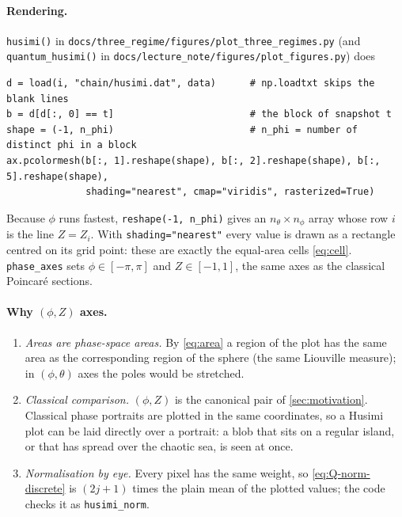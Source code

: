 \documentclass[11pt,a4paper]{article}
\begin{document}
\paragraph{Rendering.} \texttt{husimi()} in \texttt{docs/three\_regime/figures/plot\_three\_regimes.py} (and
\texttt{quantum\_husimi()} in \texttt{docs/lecture\_note/figures/plot\_figures.py}) does
\begin{lstlisting}[style=python]
d = load(i, "chain/husimi.dat", data)      # np.loadtxt skips the blank lines
b = d[d[:, 0] == t]                        # the block of snapshot t
shape = (-1, n_phi)                        # n_phi = number of distinct phi in a block
ax.pcolormesh(b[:, 1].reshape(shape), b[:, 2].reshape(shape), b[:, 5].reshape(shape),
              shading="nearest", cmap="viridis", rasterized=True)
\end{lstlisting}
Because $\phi$ runs fastest, \lstinline[style=python]!reshape(-1, n_phi)! gives an $n_\theta\times n_\phi$ array whose
row $i$ is the line $Z = Z_i$. With \lstinline[style=python]!shading="nearest"! every value is drawn as a rectangle
centred on its grid point: these are exactly the equal-area cells \eqref{eq:cell}. \texttt{phase\_axes} sets
$\phi\in[-\pi,\pi]$ and $Z\in[-1,1]$, the same axes as the classical Poincar\'e sections.

\paragraph{Why $(\phi,Z)$ axes.}
\begin{enumerate}
  \item \emph{Areas are phase-space areas.} By \eqref{eq:area} a region of the plot has the same area as the
  corresponding region of the sphere (the same Liouville measure); in $(\phi,\theta)$ axes the poles would be stretched.
  \item \emph{Classical comparison.} $(\phi,Z)$ is the canonical pair of \cref{sec:motivation}. Classical phase portraits
  are plotted in the same coordinates, so a Husimi plot can be laid directly over a portrait: a blob that sits on a
  regular island, or that has spread over the chaotic sea, is seen at once.
  \item \emph{Normalisation by eye.} Every pixel has the same weight, so \eqref{eq:Q-norm-discrete} is $(2j+1)$ times
  the plain mean of the plotted values; the code checks it as \texttt{husimi\_norm}.
\end{enumerate}
\end{document}
